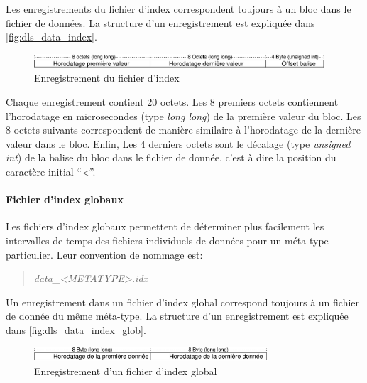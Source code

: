 \documentclass[a4paper,12pt,BCOR6mm,bibtotoc,idxtotoc]{scrbook}
\begin{document}
Les enregistrements du fichier d'index correspondent toujours \`a
un bloc dans le fichier de donn\'ees. La structure d'un enregistrement
est expliqu\'ee dans \autoref{fig:dls_data_index}.

\begin{figure}[htb]
  \begin{center}
    \includegraphics[height=15pt]{bilder/dls_data_index_fr}
  \end{center}
  \caption{Enregistrement du fichier d'index}
  \label{fig:dls_data_index}
\end{figure}

Chaque enregistrement contient 20 octets. Les 8 premiers octets
contiennent l'horodatage en microsecondes (type \textit{long long}) de
la premi\`ere valeur du bloc.  Les 8 octets suivants correspondent de
mani\`ere similaire \`a l'horodatage de la derni\`ere valeur dans le
bloc. Enfin, Les 4 derniers octets sont le d\'ecalage (type
\textit{unsigned int}) de la balise du bloc dans le fichier de
donn\'ee, c'est \`a dire la position du caract\`ere initial
``\textit{\textless}''.

\paragraph{Fichier d'index globaux}
Les fichiers d'index globaux permettent de d\'eterminer plus
facilement les intervalles de temps des fichiers individuels de
donn\'ees pour un m\'eta-type particulier. Leur convention de nommage
est:

\begin{quote}
  \textit{data\_\textless METATYPE\textgreater.idx}
\end{quote}

Un enregistrement dans un fichier d'index global correspond toujours
\`a un fichier de donn\'ee du m\^eme m\'eta-type.  La structure d'un
enregistrement est expliqu\'ee dans \autoref{fig:dls_data_index_glob}.

\begin{figure}[htb]
  \begin{center}
    \includegraphics[height=15pt]{bilder/dls_data_index_glob_fr}
  \end{center}
  \caption{Enregistrement d'un fichier d'index global}
  \label{fig:dls_data_index_glob}
\end{figure}
\end{document}
